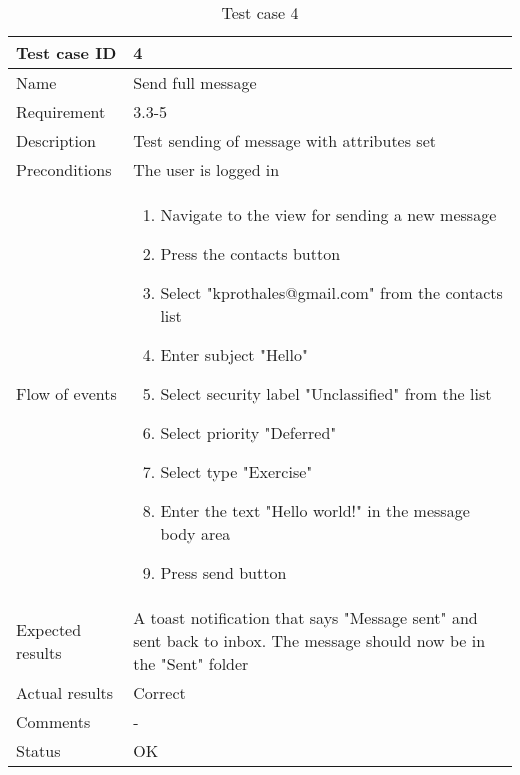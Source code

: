 		\begin{table}
			\begin{tabular}{l|p{10cm}}
				Test case ID & 4 \\ \hline
				Name & Send full message\\ \hline
				Requirement & 3.3-5\\ \hline
				Description & Test sending of message with attributes set\\ \hline
				Preconditions & The user is logged in\\ \hline
				Flow of events & 
					\begin{enumerate}
						\item{}Navigate to the view for sending a new message
						\item{}Press the contacts button
						\item{}Select "kprothales@gmail.com" from the contacts list
						\item{}Enter subject "Hello"
						\item{}Select security label "Unclassified" from the list
						\item{}Select priority "Deferred"
						\item{}Select type "Exercise"
						\item{}Enter the text "Hello world!" in the message body area
						\item{}Press send button
					\end{enumerate} \\ \hline
				Expected results & A toast notification that says "Message sent" and sent back to inbox. The message 							should now be in the "Sent" folder\\ \hline
				Actual results & Correct\\ \hline
				Comments &-\\ \hline
				Status &OK \\ \hline
			\end{tabular}
			\caption{Test case 4} \label{tab:case4}
		\end{table}


